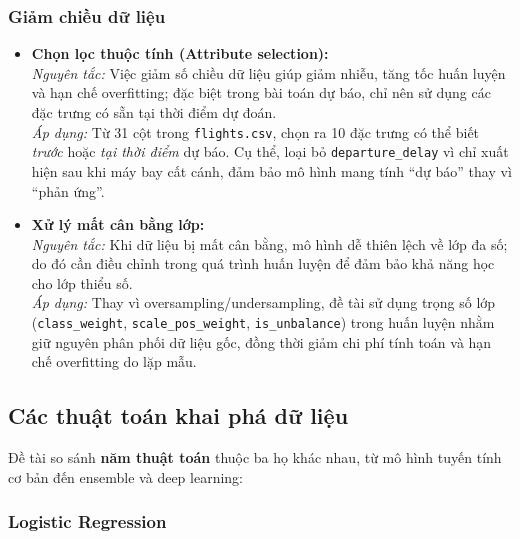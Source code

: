 \subsubsection{Giảm chiều dữ liệu}

\begin{itemize}
    \item \textbf{Chọn lọc thuộc tính (Attribute selection):} \\
    \textit{Nguyên tắc:} Việc giảm số chiều dữ liệu giúp giảm nhiễu,
    tăng tốc huấn luyện và hạn chế overfitting; đặc biệt trong bài toán dự báo,
    chỉ nên sử dụng các đặc trưng có sẵn tại thời điểm dự đoán. \\
    \textit{Áp dụng:} Từ 31 cột trong \texttt{flights.csv}, chọn ra 10 đặc trưng
    có thể biết \textit{trước} hoặc \textit{tại thời điểm} dự báo.
    Cụ thể, loại bỏ \texttt{departure\_delay} vì chỉ xuất hiện sau khi máy bay cất cánh,
    đảm bảo mô hình mang tính ``dự báo'' thay vì ``phản ứng''.

    \item \textbf{Xử lý mất cân bằng lớp:} \\
    \textit{Nguyên tắc:} Khi dữ liệu bị mất cân bằng, mô hình dễ thiên lệch về lớp đa số;
    do đó cần điều chỉnh trong quá trình huấn luyện để đảm bảo khả năng học cho lớp thiểu số. \\
    \textit{Áp dụng:} Thay vì oversampling/undersampling, đề tài sử dụng trọng số lớp
    (\texttt{class\_weight}, \texttt{scale\_pos\_weight}, \texttt{is\_unbalance})
    trong huấn luyện nhằm giữ nguyên phân phối dữ liệu gốc,
    đồng thời giảm chi phí tính toán và hạn chế overfitting do lặp mẫu.
\end{itemize}

\subsection{Các thuật toán khai phá dữ liệu}

Đề tài so sánh \textbf{năm thuật toán} thuộc ba họ khác nhau,
từ mô hình tuyến tính cơ bản đến ensemble và deep learning:

\subsubsection{Logistic Regression}

